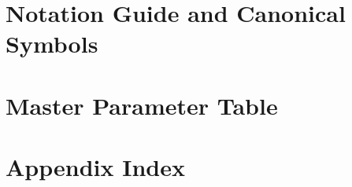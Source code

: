 \documentclass[review,number,sort&compress]{elsarticle}
\begin{document}
\appendix

\section{Notation Guide and Canonical Symbols}
\label{app:notation}

\section{Master Parameter Table}
\label{app:parameters}

\section{Appendix Index}
\label{app:index}
\end{document}
